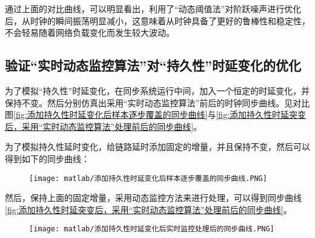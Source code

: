 通过上面的对比曲线，可以明显看出，利用了“动态阈值法”对阶跃噪声进行优化后，从时钟的瞬间振荡明显减小，这意味着从时钟具备了更好的鲁棒性和稳定性，不会轻易随着网络负载变化而发生较大波动。

\subsection{验证“实时动态监控算法”对“持久性”时延变化的优化}
为了模拟“持久性”时延变化，在同步系统运行中间，加入一个恒定的时延变化，并保持不变。然后分别仿真出采用“实时动态监控算法”前后的时钟同步曲线。见对比图\ref{fig:添加持久性时延变化后样本逐步覆盖的同步曲线}与\ref{fig:添加持久性时延突变后，采用“实时动态监控算法”处理前后的同步曲线}。

为了模拟持久性延时变化，给链路延时添加固定的增量，并且保持不变，然后可以得到如下的同步曲线：

\begin{figure}[!hbp]
  \centering
  \begin{minipage}[b]{1\textwidth}
    \captionstyle{\centering}
    \centering
    \texttt{[image: matlab/添加持久性时延变化后样本逐步覆盖的同步曲线.PNG]}
  \end{minipage}     
\end{figure}

然后，保持上面的固定增量，采用动态监控方法来进行处理，可以得到同步曲线\ref{fig:添加持久性时延突变后，采用“实时动态监控算法”处理前后的同步曲线}。

\begin{figure}[htbp]
  \centering
  \begin{minipage}[b]{1\textwidth}
    \captionstyle{\centering}
    \centering
    \texttt{[image: matlab/添加持久性时延变化后实时监控处理后的同步曲线.PNG]}
  \end{minipage}     
\end{figure}

